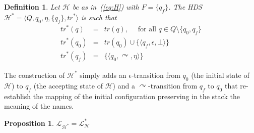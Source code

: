 \documentclass[runningheads,a4paper]{llncs}
\newcommand{\pushtr}{\curvearrowright}
\newcommand{\trans}{\mathit{tr}}
\newcommand{\emptystr}{\epsilon}
\newcommand{\lang}[1]{\mathcal{L}_{#1}}
\newcommand{\hdns}{HDS}
\newtheorem{definition}{Theorem}[section]
\newtheorem{proposition}{Theorem}[section]
\newtheorem{definition}{Definition}[section]
\newtheorem{proposition}{Proposition}[section]
\newcommand{\tuple}[1]{\langle#1\rangle}
\newcommand{\hdtr}[3]{\tuple{#2,#1,#3}}
\begin{document}
\begin{definition}\label{def:H*}
  Let $\mathcal H$ be as in~(\ref{eq:H}) with $F = \{q_f\}$.
The \hdns\ $\mathcal H^\ast = \tuple{Q, q_0, \eta, \{q_f\},
    \trans^\ast}$ is such that
  \begin{eqnarray*}
    \trans^\ast(q) & = & \trans(q),
    \quad\text{ for all } q \in Q \setminus \{q_0, q_f\}
    \\
    \trans^\ast(q_0) & = & \trans(q_0) \cup \{\hdtr \emptystr {q_f} \bot\}
    \\
    \trans^\ast(q_f) & = & \{\tuple{q_0,\pushtr,\eta}\}
  \end{eqnarray*}
\end{definition}
The construction of ${\mathcal H}^\ast$ simply adds an
$\emptystr$-transition from $q_0$ (the initial state of $\mathcal H$)
to $q_f$ (the accepting state of $\mathcal H$) and a
$\pushtr$-transition from $q_f$ to $q_0$ that re-establish the mapping
of the initial configuration preserving in the stack the meaning of
the names.
\begin{proposition}\label{prop:H*}
    $\lang{\mathcal H^\ast} = \lang{\mathcal H}^\ast$
\end{proposition}
\end{document}
